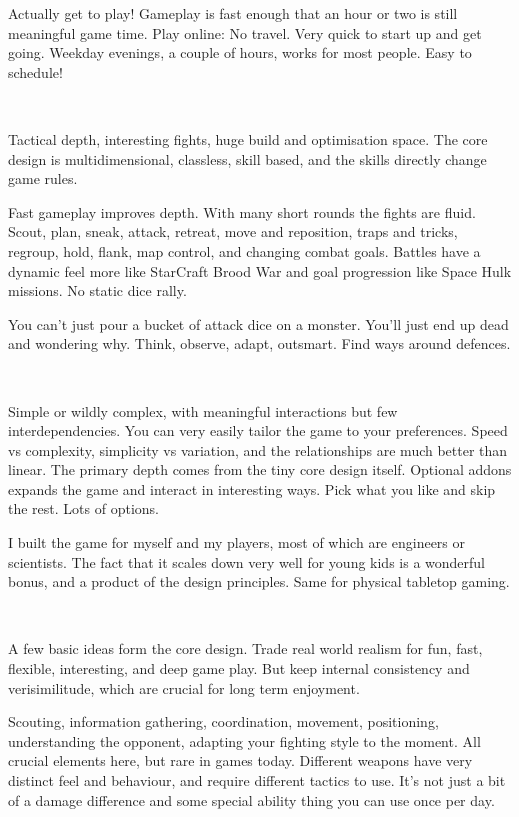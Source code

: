\noindent
Actually get to play! Gameplay is fast enough that an hour or two is still meaningful game time. Play online: No travel. Very quick to start up and get going. Weekday evenings, a couple of hours, works for most people. Easy to schedule!

\

\noindent
Tactical depth, interesting fights, huge build and optimisation space. The core design is multidimensional, classless, skill based, and the skills directly change game rules.

Fast gameplay improves depth. With many short rounds the fights are fluid. Scout, plan, sneak, attack, retreat, move and reposition, traps and tricks, regroup, hold, flank, map control, and changing combat goals. 
Battles have a dynamic feel more like StarCraft Brood War and goal progression like Space Hulk missions. No static dice rally.

You can't just pour a bucket of attack dice on a monster. You'll just end up dead and wondering why. Think, observe, adapt, outsmart. Find ways around defences.

\

\noindent
Simple or wildly complex, with meaningful interactions but few interdependencies. You can very easily tailor the game to your preferences. Speed vs complexity, simplicity vs variation, and the relationships are much better than linear. The primary depth comes from the tiny core design itself. Optional addons expands the game and interact in interesting ways. Pick what you like and skip the rest. Lots of options.

I built the game for myself and my players, most of which are engineers or scientists. The fact that it scales down very well for young kids is a wonderful bonus, and a product of the design principles. Same for physical tabletop gaming.

\

\noindent
A few basic ideas form the core design. Trade real world realism for fun, fast, flexible, interesting, and deep game play. But keep internal consistency and verisimilitude, which are crucial for long term enjoyment.

Scouting, information gathering, coordination, movement, positioning, understanding the opponent, adapting your fighting style to the moment. All crucial elements here, but rare in games today. Different weapons have very distinct feel and behaviour, and require different tactics to use. It's not just a bit of a damage difference and some special ability thing you can use once per day. 





